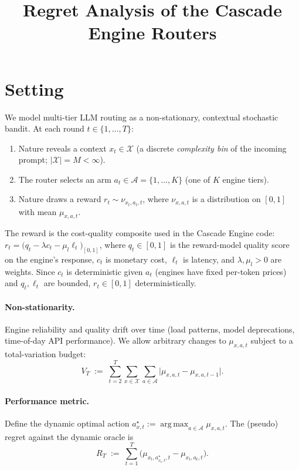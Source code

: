 \documentclass[11pt]{article}
\title{Regret Analysis of the Cascade Engine Routers}
\author{}
\date{}
\theoremstyle{definition}
\DeclareMathOperator*{\argmax}{arg\,max}
\begin{document}
\maketitle

\section{Setting}
\label{sec:setting}

We model multi-tier LLM routing as a non-stationary, contextual stochastic bandit. At each round $t \in \{1, \dots, T\}$:
\begin{enumerate}
    \item Nature reveals a context $x_t \in \mathcal{X}$ (a discrete \emph{complexity bin} of the incoming prompt; $|\mathcal{X}| = M < \infty$).
    \item The router selects an arm $a_t \in \mathcal{A} = \{1, \dots, K\}$ (one of $K$ engine tiers).
    \item Nature draws a reward $r_t \sim \nu_{x_t, a_t, t}$, where $\nu_{x,a,t}$ is a distribution on $[0,1]$ with mean $\mu_{x,a,t}$.
\end{enumerate}

The reward is the cost-quality composite used in the Cascade Engine code: $r_t = \big(q_t - \lambda c_t - \mu_l \ell_t\big)_{[0,1]}$, where $q_t \in [0,1]$ is the reward-model quality score on the engine's response, $c_t$ is monetary cost, $\ell_t$ is latency, and $\lambda, \mu_l > 0$ are weights. Since $c_t$ is deterministic given $a_t$ (engines have fixed per-token prices) and $q_t, \ell_t$ are bounded, $r_t \in [0,1]$ deterministically.

\paragraph{Non-stationarity.} Engine reliability and quality drift over time (load patterns, model deprecations, time-of-day API performance). We allow arbitrary changes to $\mu_{x,a,t}$ subject to a total-variation budget:
\begin{equation}
    V_T \;:=\; \sum_{t=2}^{T} \sum_{x \in \mathcal{X}} \sum_{a \in \mathcal{A}} \big|\mu_{x,a,t} - \mu_{x,a,t-1}\big|.
    \label{eq:variation-budget}
\end{equation}

\paragraph{Performance metric.} Define the dynamic optimal action $a^\star_{x,t} := \argmax_{a \in \mathcal{A}} \mu_{x,a,t}$. The (pseudo) regret against the dynamic oracle is
\begin{equation}
    R_T \;:=\; \sum_{t=1}^{T} \Big(\mu_{x_t, a^\star_{x_t, t}, t} - \mu_{x_t, a_t, t}\Big).
    \label{eq:regret-def}
\end{equation}
\end{document}
